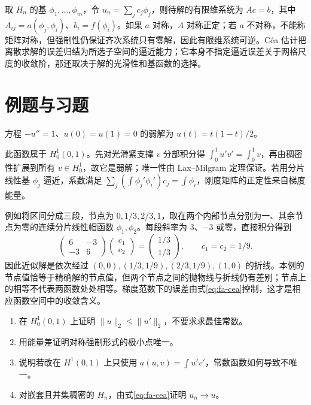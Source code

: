 \documentclass[UTF8,12pt,a4paper,fontset=fandol]{ctexbook}
\begin{document}
取 $H_n$ 的基 $\phi_1,\ldots,\phi_m$，令 $u_n=\sum_jc_j\phi_j$，则待解的有限维系统为 $Ac=b$，其中 $A_{ij}=a(\phi_j,\phi_i)$、$b_i=f(\phi_i)$。如果 $a$ 对称，$A$ 对称正定；若 $a$ 不对称，不能称矩阵对称，但强制性仍保证齐次系统只有零解，因此有限维系统可逆。Céa 估计把离散求解的误差归结为所选子空间的逼近能力；它本身不指定逼近误差关于网格尺度的收敛阶，那还取决于解的光滑性和基函数的选择。

\section{例题与习题}
\begin{example}
方程 $-u''=1$、$u(0)=u(1)=0$ 的弱解为 $u(t)=t(1-t)/2$。
\end{example}
\begin{solve}
此函数属于 $H_0^1(0,1)$。先对光滑紧支撑 $v$ 分部积分得 $\int_0^1u'v'=\int_0^1v$，再由稠密性扩展到所有 $v\in H_0^1$，故它是弱解；唯一性由 Lax--Milgram 定理保证。若用分片线性基 $\phi_j$ 逼近，系数满足 $\sum_j(\int\phi_j'\phi_i')c_j=\int\phi_i$，刚度矩阵的正定性来自梯度能量。
\end{solve}

例如将区间分成三段，节点为 $0,1/3,2/3,1$，取在两个内部节点分别为一、其余节点为零的连续分片线性帽函数 $\phi_1,\phi_2$。每段斜率为 $3$、$-3$ 或零，直接积分得到
\[
 \begin{pmatrix}6&-3\\-3&6\end{pmatrix}
 \begin{pmatrix}c_1\\c_2\end{pmatrix}
 =\begin{pmatrix}1/3\\1/3\end{pmatrix},
 \qquad c_1=c_2=1/9.
\]
因此近似解是依次经过 $(0,0),(1/3,1/9),(2/3,1/9),(1,0)$ 的折线。本例的节点值恰等于精确解的节点值，但两个节点之间的抛物线与折线仍有差别；节点上的相等不代表两函数处处相等。梯度范数下的误差由式\eqref{eq:fa-cea}控制，这才是相应函数空间中的收敛含义。
\begin{enumerate}
 \item 在 $H_0^1(0,1)$ 上证明 $\|u\|_2\leq\|u'\|_2$，不要求求最佳常数。
 \item 用能量差证明对称强制形式的极小点唯一。
 \item 说明若改在 $H^1(0,1)$ 上只使用 $a(u,v)=\int u'v'$，常数函数如何导致不唯一。
 \item\label{exer:fa-galerkin} 对嵌套且并集稠密的 $H_n$，由式\eqref{eq:fa-cea}证明 $u_n\to u$。
\end{enumerate}
\end{document}
